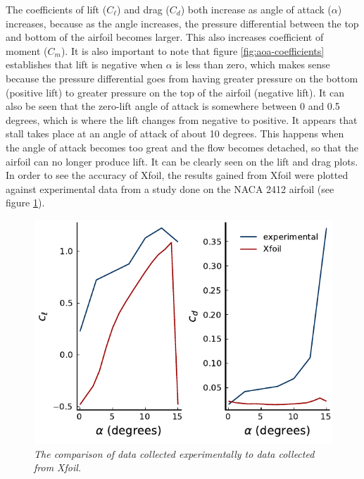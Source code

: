 \documentclass[journal]{new-aiaa}
\begin{document}
	The coefficients of lift (\(C_\ell\)) and drag (\(C_d\)) both increase as angle of attack (\(\alpha\)) increases, because as the angle increases, the pressure differential between the top and bottom of the airfoil becomes larger. This also increases coefficient of moment (\(C_m\)). It is also important to note that figure \ref{fig:aoa-coefficients} establishes that lift is negative when \(\alpha\) is less than zero, which makes sense because the pressure differential goes from having greater pressure on the bottom (positive lift) to greater pressure on the top of the airfoil (negative lift). It can also be seen that the zero-lift angle of attack is somewhere between 0 and 0.5 degrees, which is where the lift changes from negative to positive. It appears that stall takes place at an angle of attack of about 10 degrees. This happens when the angle of attack becomes too great and the flow becomes detached, so that the airfoil can no longer produce lift. It can be clearly seen on the lift and drag plots.\\
	
	In order to see the accuracy of Xfoil, the results gained from Xfoil were plotted against experimental data from a study done on the NACA 2412 airfoil (see figure \ref{fig:airfoil-comparison}).\\
	
	\begin{figure}[H]
		\centering
		\includegraphics{../graphics/airfoil-compare.pdf}
		\caption{\emph{The comparison of data collected experimentally to data collected from Xfoil.}}
		\label{fig:airfoil-comparison}
	\end{figure}
	
\end{document}

